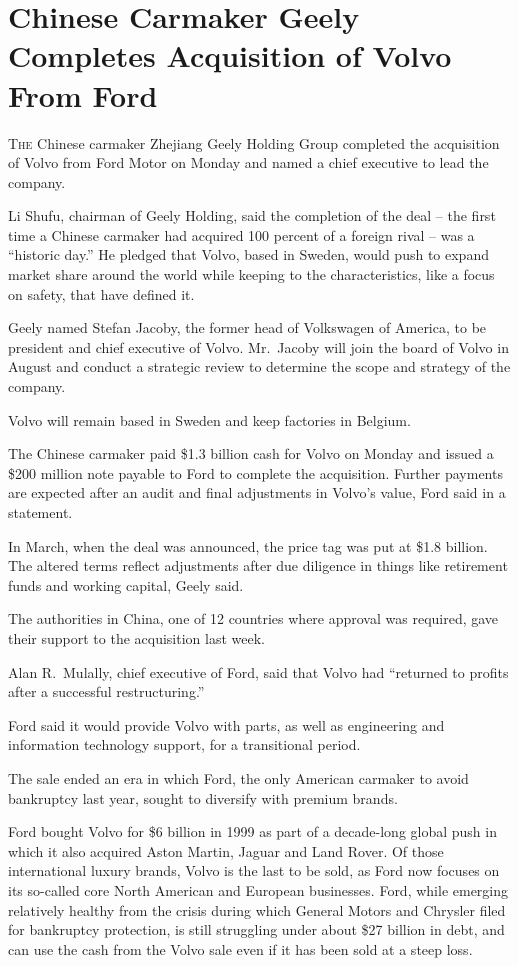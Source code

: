 ﻿\documentclass[12pt]{article}
\begin{document}
\section{Chinese Carmaker Geely Completes Acquisition of Volvo From Ford}

\lettrine{T}{he} Chinese carmaker Zhejiang Geely Holding Group completed the
acquisition of Volvo from Ford Motor on Monday and named a chief executive to lead the company.

Li Shufu, chairman of Geely Holding, said the completion of the deal -- the first time a Chinese
carmaker had acquired 100 percent of a foreign rival -- was a ``historic day.'' He pledged that
Volvo, based in Sweden, would push to expand market share around the world while keeping to the
characteristics, like a focus on safety, that have defined it.

Geely named Stefan Jacoby, the former head of Volkswagen of America, to be president and chief
executive of Volvo. Mr.~Jacoby will join the board of Volvo in August and conduct a strategic review
to determine the scope and strategy of the company.

Volvo will remain based in Sweden and keep factories in Belgium.

The Chinese carmaker paid \$1.3 billion cash for Volvo on Monday and issued a \$200 million note
payable to Ford to complete the acquisition. Further payments are expected after an audit and final
adjustments in Volvo's value, Ford said in a statement.

In March, when the deal was announced, the price tag was put at \$1.8 billion. The altered terms
reflect adjustments after due diligence in things like retirement funds and working capital, Geely
said.

The authorities in China, one of 12 countries where approval was required, gave their support to the
acquisition last week.

Alan R.~Mulally, chief executive of Ford, said that Volvo had ``returned to profits after a
successful restructuring.''

Ford said it would provide Volvo with parts, as well as engineering and information technology
support, for a transitional period.

The sale ended an era in which Ford, the only American carmaker to avoid bankruptcy last year,
sought to diversify with premium brands.

Ford bought Volvo for \$6 billion in 1999 as part of a decade-long global push in which it also
acquired Aston Martin, Jaguar and Land Rover. Of those international luxury brands, Volvo is the
last to be sold, as Ford now focuses on its so-called core North American and European businesses.
Ford, while emerging relatively healthy from the crisis during which General Motors and Chrysler
filed for bankruptcy protection, is still struggling under about \$27 billion in debt, and can use
the cash from the Volvo sale even if it has been sold at a steep loss.
\end{document}
